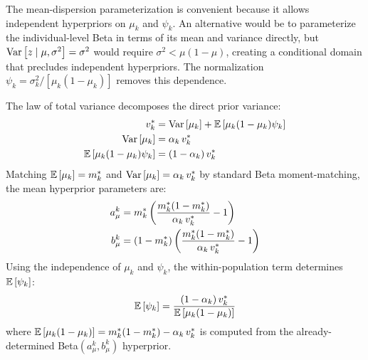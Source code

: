 The mean-dispersion parameterization is convenient because it allows
independent hyperpriors on $\mu_k$ and $\psi_k$. An alternative would be to
parameterize the individual-level Beta in terms of its mean and variance
directly, but $\text{Var}\left[z \mid \mu, \sigma^2\right] = \sigma^2$ would require $\sigma^2 <
\mu(1-\mu)$, creating a conditional domain that precludes independent
hyperpriors. The normalization $\psi_k = \sigma_k^2 / [\mu_k(1 - \mu_k)]$
removes this dependence.

The law of total variance decomposes the direct prior variance:
\begin{align}
  \label{eq:app_bb_total_var}
  v^*_k &= \text{Var}\left[\mu_k\right] + \mathbb{E}\left[\mu_k(1 - \mu_k)\psi_k\right] \\
  \text{Var}\left[\mu_k\right] &= \alpha_k\,v^*_k \\
  \mathbb{E}\left[\mu_k(1 - \mu_k)\psi_k\right] &= (1 - \alpha_k)\,v^*_k
\end{align}
Matching $\mathbb{E}\left[\mu_k\right] = m^*_k$ and $\text{Var}\left[\mu_k\right] = \alpha_k\,v^*_k$
by standard Beta moment-matching, the mean hyperprior parameters are:
\begin{align}
  a_\mu^k &= m^*_k
    \left(\frac{m^*_k(1 - m^*_k)}{\alpha_k\,v^*_k} - 1\right) \\
  b_\mu^k &= (1 - m^*_k)
    \left(\frac{m^*_k(1 - m^*_k)}{\alpha_k\,v^*_k} - 1\right)
\end{align}
Using the independence of $\mu_k$ and $\psi_k$, the within-population
term determines $\mathbb{E}\left[\psi_k\right]$:
\begin{equation}
  \mathbb{E}\left[\psi_k\right] = \frac{(1 - \alpha_k)\,v^*_k}{\mathbb{E}\left[\mu_k(1 - \mu_k)\right]}
\end{equation}
where $\mathbb{E}\left[\mu_k(1 - \mu_k)\right] = m^*_k(1-m^*_k) - \alpha_k\,v^*_k$ is computed
from the already-determined Beta$(a_\mu^k, b_\mu^k)$ hyperprior.

